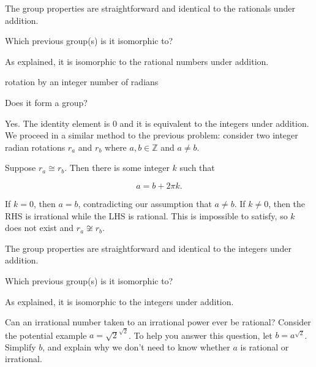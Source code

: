 \documentclass[../gatm_answers.tex]{subfiles}
\begin{document}
The group properties are straightforward and identical to the rationals under addition.

\begin{iinner_problem}
\item Which previous group(s) is it isomorphic to?
\end{iinner_problem}

As explained, it is isomorphic to the rational numbers under addition.

\begin{inner_problem}
\item rotation by an integer number of radians
\end{inner_problem}

\begin{iinner_problem}[start=1]
\item Does it form a group?
\end{iinner_problem}

Yes. The identity element is $0$ and it is equivalent to the integers under addition. We proceed in a similar method to the previous problem: consider two integer radian rotations $r_a$ and $r_b$ where $a,b\in \mathbb{Z}$ and $a\neq b$.

Suppose $r_a\cong r_b$. Then there is some integer $k$ such that

$$a=b+2\pi k.$$

If $k=0$, then $a=b$, contradicting our assumption that $a\neq b$. If $k\neq 0$, then the RHS is irrational while the LHS is rational. This is impossible to satisfy, so $k$ does not exist and $r_a\not\cong r_b$.

The group properties are straightforward and identical to the integers under addition.

\begin{iinner_problem}
\item Which previous group(s) is it isomorphic to?
\end{iinner_problem}

As explained, it is isomorphic to the integers under addition.

\begin{outer_problem}
\item Can an irrational number taken to an irrational power ever be rational? Consider the potential example $a = \sqrt{2}^{\sqrt{2}}$. To help you answer this question, let $b = a^{\sqrt{2}}$. Simplify $b$, and explain why we don’t need to know whether $a$ is rational or irrational.
\end{outer_problem}
\end{document}
